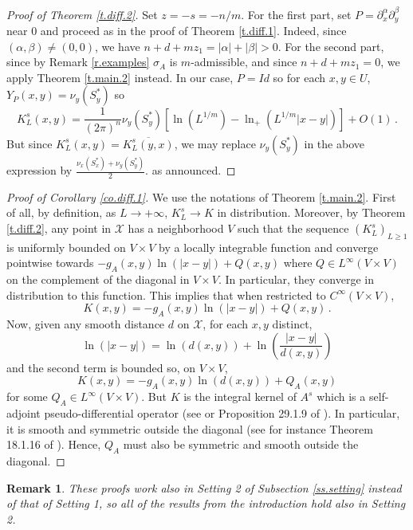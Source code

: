 \documentclass[10pt,twoside]{article}
\newcommand{\man}{\mathcal{X}}
\numberwithin{theorem}{section}
\newtheorem{remark}{Remark}
\begin{document}
\begin{proof}[ Proof of Theorem \ref{t.diff.2}]
Set $z=-s=-n/m$. For the first part, set $P=\partial^\alpha_x\partial^\beta_y$ near $0$ and proceed as in the proof of Theorem \ref{t.diff.1}. Indeed, since $(\alpha,\beta)\neq (0,0)$, we have $n+d+mz_1=|\alpha|+|\beta|>0$. For the second part, since by Remark \ref{r.examples} $\sigma_A$ is $m$-admissible, and since $n+d+mz_1=0$, we apply Theorem \ref{t.main.2} instead. In our case, $P=Id$ so for each $x,y\in U$, $Y_P(x,y)=\nu_y\left(S^*_y\right)$ so
\[
K^s_L(x,y)=\frac{1}{(2\pi)^n}\nu_y\left(S^*_y\right)\left[\ln\left(L^{1/m}\right)-\ln_+\left(L^{1/m}|x-y|\right)\right]+O(1)\, .
\]
But since $K^s_L(x,y)=\overline{K^s_L(y,x)}$, we may replace $\nu_y\left(S^*_y\right)$ in the above expression by $\frac{\nu_x\left(S^*_x\right)+\nu_y\left(S^*_y\right)}{2}$.
as announced.
\end{proof}

\begin{proof}[Proof of Corollary \ref{co.diff.1}]
We use the notations of Theorem \ref{t.main.2}. First of all, by definition, as $L\rightarrow +\infty$, $K_L^s\rightarrow K$ in distribution. Moreover, by Theorem \ref{t.diff.2}, any point in $\man$ has a neighborhood $V$ such that the sequence $(K_L^s)_{L\geq 1}$ is uniformly bounded on $V\times V$ by a locally integrable function and converge pointwise towards $-g_A(x,y)\ln\left(|x-y|\right)+Q(x,y)$ where $Q\in L^\infty(V\times V)$ on the complement of the diagonal in $V\times V$. In particular, they converge in distribution to this function. This implies that when restricted to $C^\infty(V\times V)$,
\[
K(x,y)=-g_A(x,y)\ln\left(|x-y|\right)+Q(x,y)\, .
\]
Now, given any smooth distance $d$ on $\man$, for each $x,y$ distinct,
\[
\ln\left(|x-y|\right)=\ln\left(d(x,y)\right)+\ln\left(\frac{|x-y|}{d(x,y)}\right)
\]
and the second term is bounded so, on $V\times V$,
\[
K(x,y)=-g_A(x,y)\ln\left(d(x,y)\right)+Q_A(x,y)
\]
for some $Q_A\in L^\infty(V\times V)$. But $K$ is the integral kernel of $A^s$ which is a self-adjoint pseudo-differential operator (see \cite{see67} or Proposition 29.1.9 of \cite{ho_apdo4}). In particular, it is smooth and symmetric outside the diagonal (see for instance Theorem 18.1.16 of \cite{ho_apdo3}). Hence, $Q_A$ must also be symmetric and smooth outside the diagonal.
\end{proof}

\begin{remark}
These proofs work also in Setting 2 of Subsection \ref{ss.setting} instead of that of Setting 1, so all of the results from the introduction hold also in Setting 2.
\end{remark}
\end{document}
